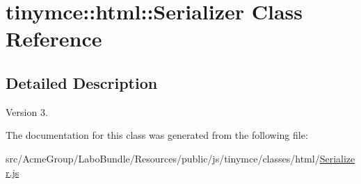 \hypertarget{classtinymce_1_1html_1_1_serializer}{\section{tinymce\+:\+:html\+:\+:Serializer Class Reference}
\label{classtinymce_1_1html_1_1_serializer}
}


\subsection{Detailed Description}
\begin{DoxyVersion}{Version}
3. 
\end{DoxyVersion}


The documentation for this class was generated from the following file\+:\begin{DoxyCompactItemize}
\item 
src/\+Acme\+Group/\+Labo\+Bundle/\+Resources/public/js/tinymce/classes/html/\hyperlink{html_2_serializer_8js}{Serializer.\+js}\end{DoxyCompactItemize}
